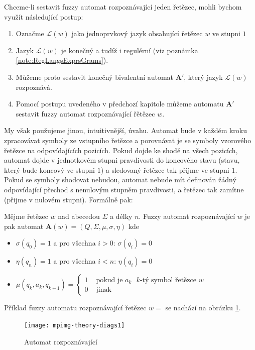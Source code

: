 Chceme-li sestavit fuzzy automat rozpoznávající jeden řetězec, mohli bychom využít následující postup:
\begin{enumerate} 
 \item Označme $\mathcal{L}(w)$ jako jednoprvkový jazyk obsahující řetězec $w$ ve stupni $1$
 \item Jazyk $\mathcal{L}(w)$ je konečný a tudíž i regulérní (viz poznámka \ref{note:RegLangsExprsGrams}).
 \item Můžeme proto sestavit konečný bivalentní automat $\mathbf{A}'$, který jazyk $\mathcal{L}(w)$ rozpoznává.
 \item Pomocí postupu uvedeného v předchozí kapitole můžeme automatu $\mathbf{A}'$ sestavit fuzzy automat rozpoznávající řětězec $w$.
\end{enumerate}

My však použujeme jinou, intuitivnější, úvahu. Automat bude v každém kroku zpracovávat symboly ze vstupního řetězce a porovnávat je se symboly vzorového řetězce na odpovídajících pozicích. Pokud dojde ke shodě na všech pozicích, automat dojde v jednotkovém stupni pravdivosti do koncového stavu (stavu, který bude koncový ve stupni $1$) a sledovaný řetězec tak přijme ve stupni $1$. Pokud se symboly shodovat nebudou, automat nebude mít definován žádný odpovídající přechod s nenulovým stupněm pravdivosti, a řetězec tak zamítne (přijme v nulovém stupni). Formálně pak:

\begin{definition} \label{def-FuzzAutRozpOme}
  Mějme řetězec $w$ nad abecedou $\Sigma$ a délky $n$. Fuzzy automat rozpoznávající $w$ je pak automat $\mathbf{A}(w) = ( Q, \Sigma, \mu, \sigma, \eta )$ kde
  \begin{itemize}
   \item $\sigma(q_0) = 1$ a pro všechna $i > 0$: $\sigma(q_i) = 0$ 
   \item $\eta(q_n) = 1$ a pro všechna $i < n$: $\eta(q_i) = 0$ 
   \item $\mu(q_{k}, a_k, q_{k+1}) = 
      \begin{cases}
	1		& \text{ pokud je $a_k$ $k$-tý symbol řetězce $w$} \\
	0		& \text{ jinak}
      \end{cases}
      $
  \end{itemize}
\end{definition}

\begin{example}
 Příklad fuzzy automatu rozpoznávající řetězec $w = $  se nachází na obrázku \ref{diag-AutRozpHell}.   

  \begin{figure}
    \texttt{[image: mpimg-theory-diags1]}
    \caption{Automat rozpoznávající } \label{diag-AutRozpHell} 
  \end{figure}
\end{example}

